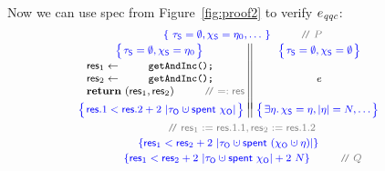 Now we can use spec from Figure~\ref{fig:proof2} to verify $e_{\mathit{qqc}}$: 
%
%
\[
{\small{
\!\!\!\!\!\!\!\!
\begin{array}{c}
  ~~~~~~~~\spec{~
  \tkns = \emptyset,
  \hists = \gist_0, \ldots
~} ~\comm{P}
\\[2pt]
%
% 
  \begin{tabular}{c || c}
$
\spec{\!\!\!
    \begin{array}{c}
    \tkns = \emptyset,
    \hists = \gist_0
  \end{array}\!\!\!}
$
&
$
\spec{\!\!\!\begin{array}{c}
    \tkns = \emptyset,
    \hists = \emptyset
  \end{array}\!\!\!}
$
\\[3pt]
   $\begin{array}{l}
      \res_1 \Asgn \esc{getAndInc();}\\[1pt]
      \res_2 \Asgn \esc{getAndInc();}\\[1pt]
      \kw{return}~(\res_1, \res_2) ~\comm{ =: \res}\!\!\!
    \end{array}$
\!\!\!\!\!\!
& ${\small{e}}$ 
\\\\[-5pt] 
$
\spec{\!\!\!
{\small{
  \begin{array}{c}
    \res.1 < \res.2 + 2 \ |\tkno \hunion \Tomb~\histo|
  \end{array}
}}
  \!\!\!}\!\!$
\!\!
&
\!\!$\spec{\!\!\!
{{
  \begin{array}{c}
    \exists \gist \ldot 
    \hists = \gist, 
    |\gist| = N,
    \ldots
  \end{array}
}}
\!\!\!}$
\end{tabular}
\\\\[-5pt]
\comm{\res_1 := \res.1.1, \res_2 := \res.1.2}
\\\\[-6pt]
\spec{
\res_1 < \res_2 + 2 \ |\tkno \hunion \Tomb~(\histo \hunion \gist)|
}
\\[3pt]
~~~~~~~~\spec{
\res_1 < \res_2 + 2 \ |\tkno \hunion \Tomb~\histo| + 2 \ N
} ~\comm{Q}
%
\end{array}
}}  
\]
